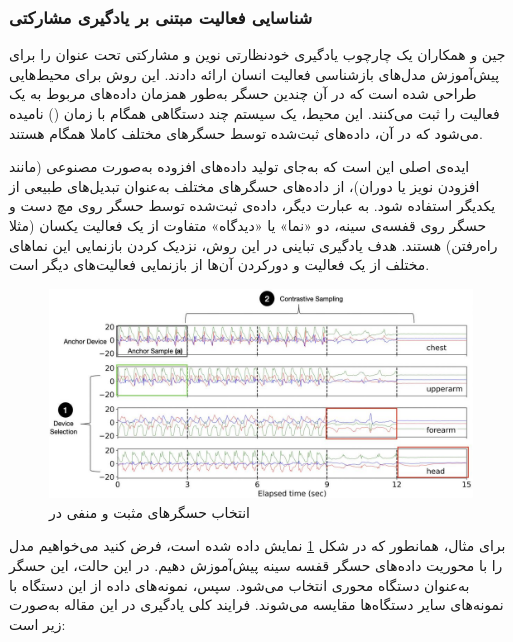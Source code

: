 \subsubsection{شناسایی فعالیت مبتنی بر یادگیری مشارکتی}

جین و همکاران \cite{jain2022collossl} یک چارچوب یادگیری خودنظارتی نوین و مشارکتی تحت عنوان  را برای پیش‌آموزش مدل‌های بازشناسی فعالیت انسان ارائه دادند. این روش برای محیط‌هایی طراحی شده است که در آن چندین حسگر به‌طور همزمان داده‌های مربوط به یک فعالیت را ثبت می‌کنند. این محیط، یک سیستم چند دستگاهی همگام با زمان () نامیده می‌شود که در آن، داده‌های ثبت‌شده توسط حسگرهای مختلف کاملا همگام هستند.

ایده‌ی اصلی  این است که به‌جای تولید داده‌های افزوده به‌صورت مصنوعی (مانند افزودن نویز یا دوران)، از داده‌های حسگرهای مختلف به‌عنوان تبدیل‌های طبیعی  از یکدیگر استفاده شود. به عبارت دیگر، داده‌ی ثبت‌شده توسط حسگر روی مچ دست و حسگر روی قفسه‌ی سینه، دو «نما» یا «دیدگاه» متفاوت از یک فعالیت یکسان (مثلا راه‌رفتن) هستند. هدف یادگیری تباینی در این روش، نزدیک کردن بازنمایی این نماهای مختلف از یک فعالیت و دورکردن آن‌ها از بازنمایی فعالیت‌های دیگر است.

\begin{figure}[t]
\centering
\includegraphics[width=1\textwidth]{Images/Chapter2/collossl.png}
\caption{انتخاب حسگرهای مثبت و منفی در }

\label{fig:collossl}

\end{figure}

برای مثال، همانطور که در شکل \ref{fig:collossl} نمایش داده شده است، فرض کنید می‌خواهیم مدل را با محوریت داده‌های حسگر قفسه سینه پیش‌آموزش دهیم. در این حالت، این حسگر به‌عنوان دستگاه محوری  انتخاب می‌شود. سپس، نمونه‌های داده از این دستگاه با نمونه‌های سایر دستگاه‌ها مقایسه می‌شوند. فرایند کلی یادگیری در این مقاله به‌صورت زیر است:


